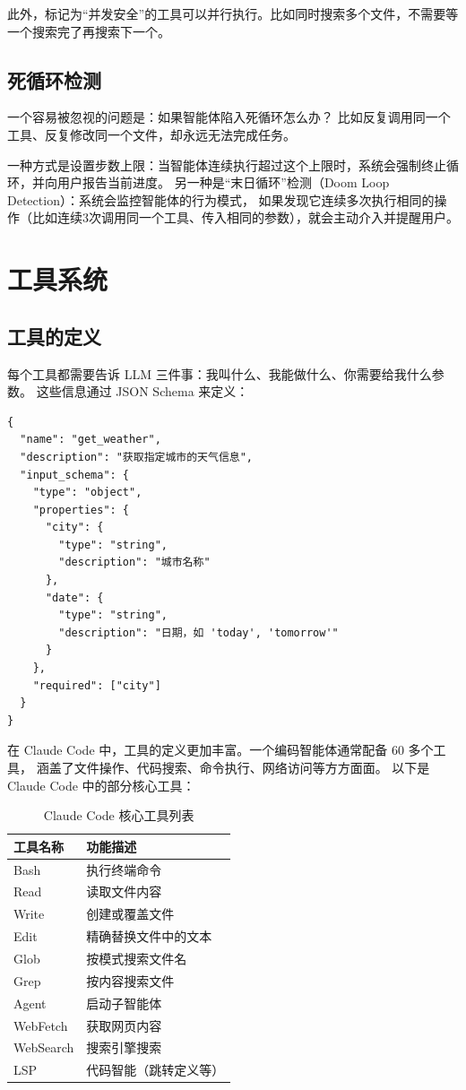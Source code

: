 此外，标记为“并发安全”的工具可以并行执行。比如同时搜索多个文件，不需要等一个搜索完了再搜索下一个。

\subsection{死循环检测}
一个容易被忽视的问题是：如果智能体陷入死循环怎么办？
比如反复调用同一个工具、反复修改同一个文件，却永远无法完成任务。

一种方式是设置步数上限：当智能体连续执行超过这个上限时，系统会强制终止循环，并向用户报告当前进度。
另一种是“末日循环”检测（Doom Loop Detection）：系统会监控智能体的行为模式，
如果发现它连续多次执行相同的操作（比如连续3次调用同一个工具、传入相同的参数），就会主动介入并提醒用户。

\section{工具系统}
\subsection{工具的定义}
每个工具都需要告诉 LLM 三件事：我叫什么、我能做什么、你需要给我什么参数。
这些信息通过 JSON Schema 来定义：

\begin{verbatim}
{
  "name": "get_weather",
  "description": "获取指定城市的天气信息",
  "input_schema": {
    "type": "object",
    "properties": {
      "city": {
        "type": "string",
        "description": "城市名称"
      },
      "date": {
        "type": "string",
        "description": "日期，如 'today', 'tomorrow'"
      }
    },
    "required": ["city"]
  }
}
\end{verbatim}

在 Claude Code 中，工具的定义更加丰富。一个编码智能体通常配备 60 多个工具，
涵盖了文件操作、代码搜索、命令执行、网络访问等方方面面。
以下是 Claude Code 中的部分核心工具：

\begin{table}[H]
	\centering
	\begin{tabular}{|l|l|}
		\hline
		\textbf{工具名称} & \textbf{功能描述} \\
		\hline
		Bash          & 执行终端命令        \\
		Read          & 读取文件内容        \\
		Write         & 创建或覆盖文件       \\
		Edit          & 精确替换文件中的文本    \\
		Glob          & 按模式搜索文件名      \\
		Grep          & 按内容搜索文件       \\
		Agent         & 启动子智能体        \\
		WebFetch      & 获取网页内容        \\
		WebSearch     & 搜索引擎搜索        \\
		LSP           & 代码智能（跳转定义等）   \\
		\hline
	\end{tabular}
	\caption{Claude Code 核心工具列表}
\end{table}

